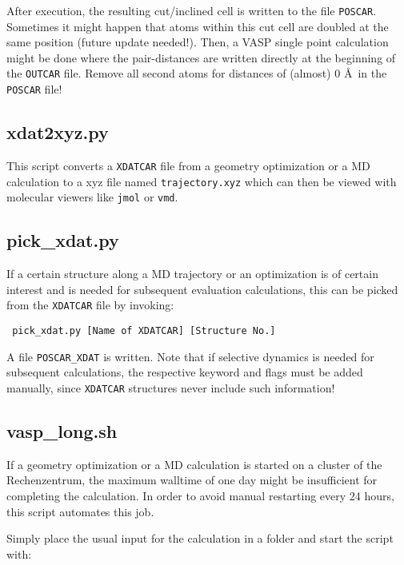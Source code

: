 \documentclass[a4paper,11pt]{article}
\begin{document}
After execution, the resulting cut/inclined cell is written to the file \texttt{POSCAR}.
Sometimes it might happen that atoms within this cut cell are doubled at the same position (future update needed!).
Then, a VASP single point calculation might be done where the pair-distances are written directly 
at the beginning of the \texttt{OUTCAR} file. Remove all second atoms for distances of (almost) 0 \AA~in 
the \texttt{POSCAR} file!


\subsection{xdat2xyz.py}\label{xdat2xyz}

This script converts a \texttt{XDATCAR} file from a geometry optimization or a MD
calculation to a xyz file named \texttt{trajectory.xyz} which can then be 
viewed with molecular viewers like \texttt{jmol} or \texttt{vmd}.

\subsection{pick\_xdat.py}\label{pick_xdat}

If a certain structure along a MD trajectory or an optimization is of certain
interest and is needed for subsequent evaluation calculations, this can be 
picked from the \texttt{XDATCAR} file by invoking:

\begin{verbatim}
 pick_xdat.py [Name of XDATCAR] [Structure No.]
 \end{verbatim}

 A file \texttt{POSCAR\_XDAT} is written. Note that if selective dynamics is needed for 
 subsequent calculations, the respective keyword and flags must be added manually, since \texttt{XDATCAR}
 structures never include such information!
 
\subsection{vasp\_long.sh}\label{vasp_long}

If a geometry optimization or a MD calculation is started on a cluster of the 
Rechenzentrum, the maximum walltime of one day might be insufficient for completing 
the calculation. In order to avoid manual restarting every 24 hours, this script 
automates this job.

Simply place the usual input for the calculation in a folder and start the 
script with:
\end{document}
